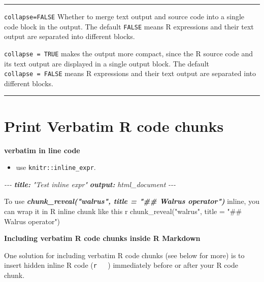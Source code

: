 \documentclass[
  a4paper,
  twoside,
  openright]{book}
\newenvironment{Shaded}{\begin{snugshade}}{\end{snugshade}}
\newcommand{\AnnotationTok}[1]{\textcolor[rgb]{0.56,0.35,0.01}{\textbf{\textit{#1}}}}
\newcommand{\CommentTok}[1]{\textcolor[rgb]{0.56,0.35,0.01}{\textit{#1}}}
\newcommand{\InformationTok}[1]{\textcolor[rgb]{0.56,0.35,0.01}{\textbf{\textit{#1}}}}
\newcommand{\NormalTok}[1]{#1}
\providecommand{\tightlist}{%
  \setlength{\itemsep}{0pt}\setlength{\parskip}{0pt}}
\theoremstyle{definition}
\theoremstyle{definition}
\theoremstyle{definition}
\theoremstyle{definition}
\theoremstyle{remark}
\begin{document}
\begin{center}\rule{0.5\linewidth}{0.5pt}\end{center}

\texttt{collapse=FALSE} Whether to merge text output and source code into a single code block in the output. The default \texttt{FALSE} means R expressions and their text output are separated into different blocks.

\texttt{collapse\ =\ TRUE} makes the output more compact, since the R source code and its text output are displayed in a single output block. The default \texttt{collapse\ =\ FALSE} means R expressions and their text output are separated into different blocks.

\begin{center}\rule{0.5\linewidth}{0.5pt}\end{center}

\section{Print Verbatim R code chunks}\label{print-verbatim-r-code-chunks}

\textbf{verbatim in line code}

\begin{itemize}
\tightlist
\item
  use \texttt{knitr::inline\_expr}.
\end{itemize}

\begin{Shaded}
\begin{Highlighting}[]
\CommentTok{{-}{-}{-}}
\AnnotationTok{title:}\CommentTok{ "Test inline expr"}
\AnnotationTok{output:}\CommentTok{ html\_document}
\CommentTok{{-}{-}{-}}

\NormalTok{To use }\InformationTok{\textasciigrave{}chunk\_reveal("walrus", title = "\#\# Walrus operator")\textasciigrave{}}\NormalTok{ inline, you can wrap it in R inline chunk like this \textasciigrave{}}\InformationTok{\textasciigrave{} \textasciigrave{}}\NormalTok{r chunk\_reveal("walrus", title = "\#\# Walrus operator")\textasciigrave{} \textasciigrave{}\textasciigrave{}}
\end{Highlighting}
\end{Shaded}

\textbf{Including verbatim R code chunks inside R Markdown}

One solution for including verbatim R code chunks (see below for more) is to insert hidden inline R code (\texttt{\textasciigrave{}r\ \ \ \textquotesingle{}\textquotesingle{}\textasciigrave{}}) immediately before or after your R code chunk.
\end{document}
